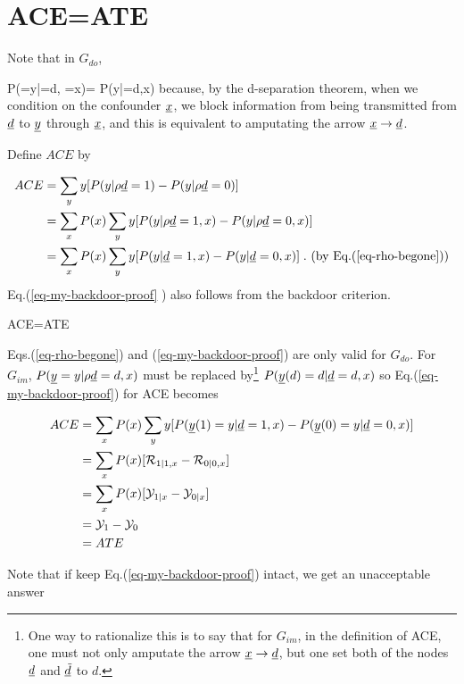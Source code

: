 \section{ACE=ATE}

Note that in $G_{do}$,

\beq
P(\rvy=y|\rho \rvd=d, \rvx=x)=
P(y|\rvd=d,x)
\;
\label{eq-rho-begone}
\eeq
because, by the d-separation
theorem,  when we condition on
the confounder ${\underline{x}}$, 
we  block information from being
transmitted from ${\underline{d}}$ to ${\underline{y}}$ through ${\underline{x}}$,
and this is equivalent to
amputating the arrow ${\underline{x}}\rightarrow{\underline{d}}$.

Define $ACE$ by

\begin{align}
ACE&=\sum_y y
[P(y|\rho{\underline{d}}=1)-P(y|\rho{\underline{d}}=0)]
\\
&=
\sum_x P(x)\sum_y y [P(y|\rho{\underline{d}}=1,x)-P(y|\rho{\underline{d}}=0,x)]
\\
&=
\sum_x P(x)\sum_y y [P(y|{\underline{d}}=1,x)-P(y|{\underline{d}}=0,x)]
\;. \text{ (by Eq.(\ref{eq-rho-begone}))}
\label{eq-my-backdoor-proof} 
\end{align}
Eq.(\ref{eq-my-backdoor-proof} )
also follows from the backdoor criterion.


\begin{claim}\label{cl-ace-ate}
\beq
ACE=ATE
\eeq
\end{claim}
\proof

Eqs.(\ref{eq-rho-begone})
and (\ref{eq-my-backdoor-proof})
are only valid for $G_{do}$.
For $G_{im}$, 
$P({\underline{y}}=y|\rho {\underline{d}}=d, x)$
must be replaced by\footnote{
One way to rationalize this is to say
that for $G_{im}$, 
in the definition of ACE,
one must not only amputate
the arrow ${\underline{x}}\rightarrow {\underline{d}}$,
but 
one 
set both of the nodes ${\underline{d}}$ and ${\underline{\tilde{d}}}$ to $d$.}
$P({\underline{y}}(d)=d|{\underline{d}}=d,x)$
so Eq.(\ref{eq-my-backdoor-proof})
for ACE becomes


\begin{align}
ACE&=
\sum_x P(x)\sum_y y [P({\underline{y}}(1)=y|{\underline{d}}=1,x)-
P({\underline{y}}(0)=y|{\underline{d}}=0,x)]
\\
&=\sum_x P(x)[{\cal R}_{1|1, x}-{\cal R}_{0|0, x}]
\\
&=
\sum_x P(x)[{\cal Y}_{1|x}-{\cal Y}_{0|x}]
\\
&=
{\cal Y}_{1}-{\cal Y}_{0}
\\
&=
ATE
\end{align}

Note that if keep
Eq.(\ref{eq-my-backdoor-proof}) intact,
we get an unacceptable answer

